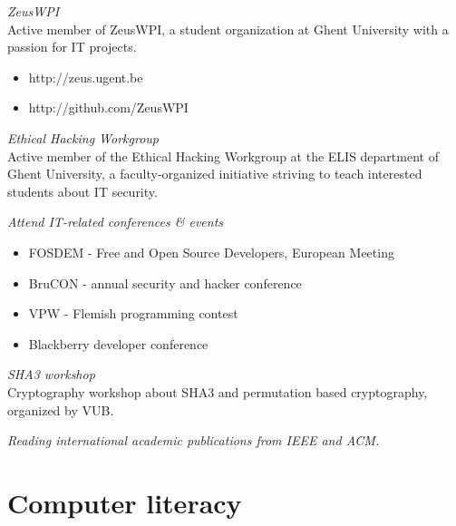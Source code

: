 \documentclass[margin, 10pt]{res} %
\begin{document}
\begin{resume}
{\sl ZeusWPI} \\
Active member of ZeusWPI, a student organization at Ghent University with a passion for IT projects.
\begin{itemize} \itemsep -2pt
\item{http://zeus.ugent.be}
\item{http://github.com/ZeusWPI}
\end{itemize}

{\sl Ethical Hacking Workgroup} \\
Active member of the Ethical Hacking Workgroup at the ELIS department of Ghent University, a faculty-organized initiative striving to teach interested students about IT security.

{\sl Attend IT-related conferences \& events}
\begin{itemize} \itemsep -2pt
\item FOSDEM - Free and Open Source Developers, European Meeting
\item BruCON - annual security and hacker conference
\item VPW - Flemish programming contest
\item Blackberry developer conference
\end{itemize}

{\sl SHA3 workshop} \\
Cryptography workshop about SHA3 and permutation based cryptography, organized by VUB. 


{\sl Reading international academic publications from IEEE and ACM.}

\end{resume}
\newpage
\section{Computer literacy}
\end{document}
